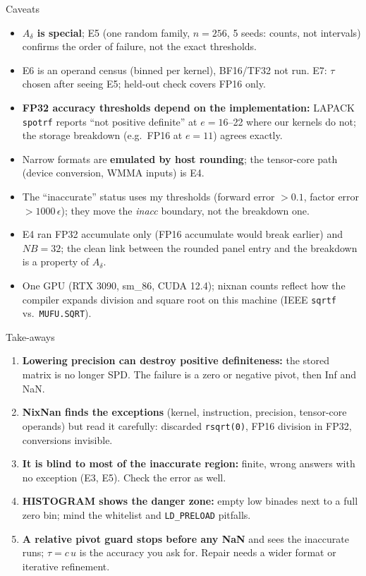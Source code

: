 \documentclass[aspectratio=169,10pt,xcolor=table]{beamer}
\begin{document}
\begin{frame}{Caveats}
\small
\begin{itemize}
\item \textbf{$A_\delta$ is special}; E5 (one random family, $n=256$, 5 seeds: counts, not intervals) confirms the order of failure, not the exact thresholds.
\item E6 is an operand census (binned per kernel), BF16/TF32 not run. E7: $\tau$ chosen after seeing E5; held-out check covers FP16 only.
\item \textbf{FP32 accuracy thresholds depend on the implementation:} LAPACK \texttt{spotrf} reports ``not positive definite'' at $e=16$--22 where our kernels do not; the storage breakdown (e.g.\ FP16 at $e=11$) agrees exactly.
\item Narrow formats are \textbf{emulated by host rounding}; the tensor-core path (device conversion, WMMA inputs) is E4.
\item The ``inaccurate'' status uses my thresholds (forward error $>0.1$, factor error $>1000\,\epsilon$); they move the \textit{inacc} boundary, not the breakdown one.
\item E4 ran FP32 accumulate only (FP16 accumulate would break earlier) and $NB=32$; the clean link between the rounded panel entry and the breakdown is a property of $A_\delta$.
\item One GPU (RTX 3090, sm\_86, CUDA 12.4); nixnan counts reflect how the compiler expands division and square root on this machine (IEEE \texttt{sqrtf} vs.\ \texttt{MUFU.SQRT}).
\end{itemize}
\end{frame}

\begin{frame}{Take-aways}
\small\raggedright
\begin{enumerate}
\item \textbf{Lowering precision can destroy positive definiteness:} the stored matrix is no longer SPD. The failure is a zero or negative pivot, then Inf and NaN.
\item \textbf{NixNan finds the exceptions} (kernel, instruction, precision, tensor-core operands) but read it carefully: discarded \texttt{rsqrt(0)}, FP16 division in FP32, conversions invisible.
\item \textbf{It is blind to most of the inaccurate region:} finite, wrong answers with no exception (E3, E5). Check the error as well.
\item \textbf{HISTOGRAM shows the danger zone:} empty low binades next to a full zero bin; mind the whitelist and \texttt{LD\_PRELOAD} pitfalls.
\item \textbf{A relative pivot guard stops before any NaN} and sees the inaccurate runs; $\tau=c\,u$ is the accuracy you ask for. Repair needs a wider format or iterative refinement.
\end{enumerate}
\vfill{}
\end{frame}
\end{document}

